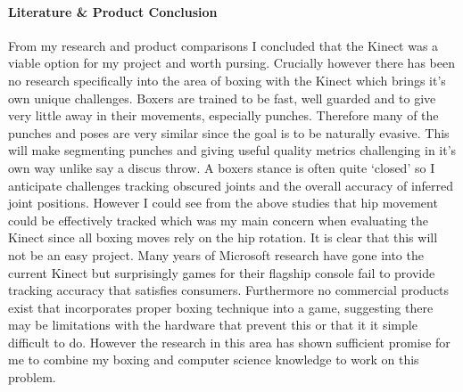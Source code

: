 \paragraph{Literature \& Product Conclusion}
From my research and product comparisons I concluded that the Kinect was a viable option for my project and worth pursing. Crucially however there has been no research specifically into the area of boxing with the Kinect which brings it's own unique challenges. Boxers are trained to be fast, well guarded and to give very little away in their movements, especially punches. Therefore many of the punches and poses are very similar since the goal is to be naturally evasive. This will make segmenting punches and giving useful quality metrics challenging in it's own way unlike say a discus throw. A boxers stance is often quite `closed' so I anticipate challenges tracking obscured joints and the overall accuracy of inferred joint positions. However I could see from the above studies that hip movement could be effectively tracked which was my main concern when evaluating the Kinect since all boxing moves rely on the hip rotation.
\newline\newline 
It is clear that this will not be an easy project. Many years of Microsoft research have gone into the current Kinect but surprisingly games for their flagship console fail to provide tracking accuracy that satisfies consumers. Furthermore no commercial products exist that incorporates proper boxing technique into a game, suggesting there may be limitations with the hardware that prevent this or that it it simple difficult to do. However the research in this area has shown sufficient promise for me to combine my boxing and computer science knowledge to work on this problem.

